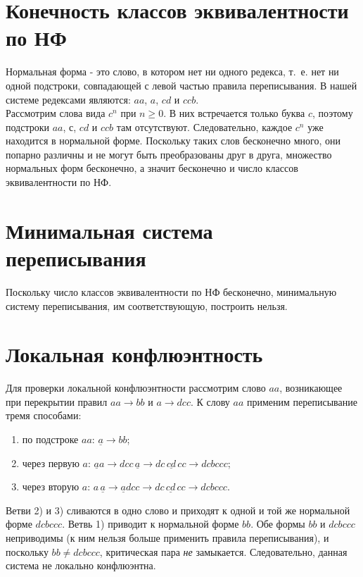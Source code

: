 \documentclass[12pt,a4paper]{article}
\begin{document}
\section*{Конечность классов эквивалентности по НФ}
Нормальная форма - это слово, в котором нет ни одного редекса, т.~е. нет ни одной подстроки, совпадающей с левой частью правила переписывания. В нашей системе редексами являются: \(aa\), \(a\), \(cd\) и \(ccb\).\\
Рассмотрим слова вида \(c^n\) при \(n\ge 0\). В них встречается только буква \(c\), поэтому подстроки \(aa\), с, \(cd\) и \(ccb\) там отсутствуют. Следовательно, каждое \(c^n\) уже находится в нормальной форме. Поскольку таких слов бесконечно много, они попарно различны и не могут быть преобразованы друг в друга, множество нормальных форм бесконечно, а значит бесконечно и число классов эквивалентности по НФ.

\section*{Минимальная система переписывания}
Поскольку число классов эквивалентности по НФ бесконечно, минимальную систему переписывания, им соответствующую, построить нельзя.

\section*{Локальная конфлюэнтность}
Для проверки локальной конфлюэнтности рассмотрим слово \(aa\), возникающее при перекрытии правил \(aa\to bb\) и \(a\to dcc\).
К слову \(aa\) применим переписывание тремя способами:
\begin{enumerate}[label=\arabic*) ,leftmargin=1.5em]
  \item по подстроке \(a\)\(a\): \(\underline{a} \to bb\);
  \item через первую \(a\): \(\underline{a}a \to dcc\,\underline{a} \to dc\,\underline{cd}\,cc \to dcbccc\);
  \item через вторую \(a\): \(a\,\underline{a} \to \underline{a}dcc \to dc\,\underline{cd}\,cc \to dcbccc\).
\end{enumerate}

Ветви 2) и 3) сливаются в одно слово и приходят к одной и той же нормальной форме \(dcbccc\).
Ветвь 1) приводит к нормальной форме \(bb\).
Обе формы \(bb\) и \(dcbccc\) неприводимы (к ним нельзя больше применить правила переписывания), и поскольку \(bb \neq dcbccc\), критическая пара \emph{не} замыкается.
Следовательно, данная система не локально конфлюэнтна.
\end{document}
